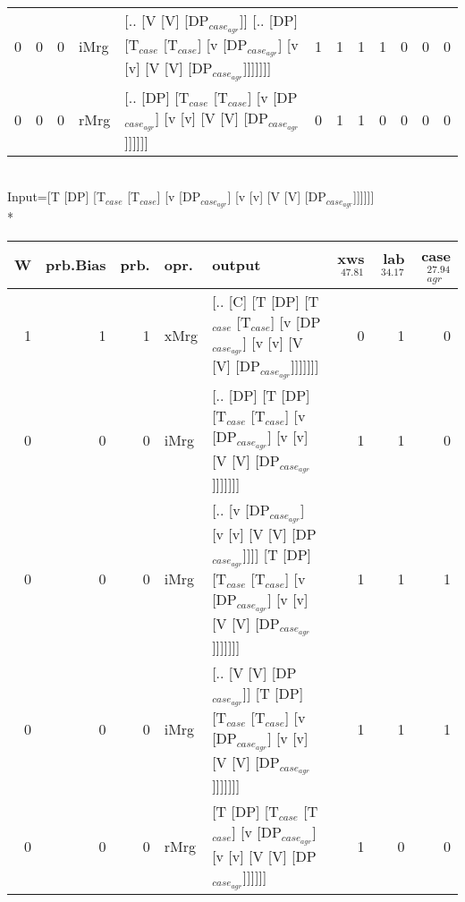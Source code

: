 \begin{tabularx}{\linewidth}{rrrlXrrrrrrr}
   0 &       0 &   0 & iMrg & [.. [V [V] [DP$_{case_{agr}}$]] [.. [DP] [T$_{case}$ [T$_{case}$] [v [DP$_{case_{agr}}$] [v [v] [V [V] [DP$_{case_{agr}}$]]]]]]]                                             &            1 &             1 &             1 &                  1 &              0 &                0 &              0 \\
   0 &       0 &   0 & rMrg & [.. [DP] [T$_{case}$ [T$_{case}$] [v [DP$_{case_{agr}}$] [v [v] [V [V] [DP$_{case_{agr}}$]]]]]]                                                                        &            0 &             1 &             1 &                  0 &              0 &                0 &              0 \\
\hline
\end{tabularx}\endgroup\\
\begingroup\scriptsize Input=[T [DP] [T$_{case}$ [T$_{case}$] [v [DP$_{case_{agr}}$] [v [v] [V [V] [DP$_{case_{agr}}$]]]]]]\\*
\begin{tabularx}{\linewidth}{rrrlXrrr}
\hline
   W &   prb.Bias &   prb. & opr.   & output                                                                                                                          &   xws$^{47.81}$ &   lab$^{34.17}$ &   case$_{agr}^{27.94}$ \\
\hline
   1 &       1 &   1 & xMrg & [.. [C] [T [DP] [T$_{case}$ [T$_{case}$] [v [DP$_{case_{agr}}$] [v [v] [V [V] [DP$_{case_{agr}}$]]]]]]]                                             &             0 &             1 &                  0 \\
   0 &       0 &   0 & iMrg & [.. [DP] [T [DP] [T$_{case}$ [T$_{case}$] [v [DP$_{case_{agr}}$] [v [v] [V [V] [DP$_{case_{agr}}$]]]]]]]                                            &             1 &             1 &                  0 \\
   0 &       0 &   0 & iMrg & [.. [v [DP$_{case_{agr}}$] [v [v] [V [V] [DP$_{case_{agr}}$]]]] [T [DP] [T$_{case}$ [T$_{case}$] [v [DP$_{case_{agr}}$] [v [v] [V [V] [DP$_{case_{agr}}$]]]]]]] &             1 &             1 &                  1 \\
   0 &       0 &   0 & iMrg & [.. [V [V] [DP$_{case_{agr}}$]] [T [DP] [T$_{case}$ [T$_{case}$] [v [DP$_{case_{agr}}$] [v [v] [V [V] [DP$_{case_{agr}}$]]]]]]]                           &             1 &             1 &                  1 \\
   0 &       0 &   0 & rMrg & [T [DP] [T$_{case}$ [T$_{case}$] [v [DP$_{case_{agr}}$] [v [v] [V [V] [DP$_{case_{agr}}$]]]]]]                                                      &             1 &             0 &                  0 \\
\hline
\end{tabularx}\endgroup\\
